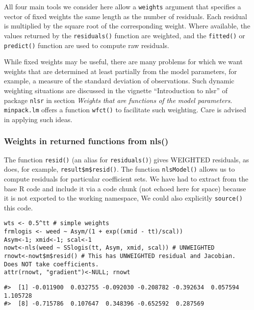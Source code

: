 All four main tools we consider here allow a \texttt{weights} argument that
specifies a vector of fixed weights the same length as the number of residuals.
Each residual is multiplied by the square root of the corresponding weight.
Where available, the values returned by the
\texttt{residuals()} function are weighted, and the \texttt{fitted()} or \texttt{predict()} function are
used to compute raw residuals.

While fixed weights may be useful, there are many problems for which
we want weights that are determined at least partially from the model
parameters, for
example, a measure of the standard deviation of observations.
Such dynamic weighting situations are discussed in the vignette
``Introduction to nlsr'' of package \texttt{nlsr} in section
\emph{Weights that are functions of the model parameters}.
\texttt{minpack.lm} offers a function \texttt{wfct()} to
facilitate such weighting. Care is advised
in applying such ideas.

\hypertarget{weights-in-returned-functions-from-nls}{%
\subsubsection{Weights in returned functions from nls()}\label{weights-in-returned-functions-from-nls}}

The function \texttt{resid()} (an alias for \texttt{residuals()}) gives WEIGHTED residuals,
as does, for example, \texttt{result\$m\$resid()}. The function \texttt{nlsModel()}
allows us to compute residuals for particular coefficient sets.
We have had to extract from the base R code and include it via a code chunk
(not echoed here for space) because it is not exported to the working namespace,
We could also explicitly \texttt{source()} this code.

\begin{verbatim}
wts <- 0.5^tt # simple weights
frmlogis <- weed ~ Asym/(1 + exp((xmid - tt)/scal))
Asym<-1; xmid<-1; scal<-1
nowt<-nls(weed ~ SSlogis(tt, Asym, xmid, scal)) # UNWEIGHTED
rnowt<-nowt$m$resid() # This has UNWEIGHTED residual and Jacobian. Does NOT take coefficients.
attr(rnowt, "gradient")<-NULL; rnowt
\end{verbatim}

\begin{verbatim}
#>  [1] -0.011900  0.032755 -0.092030 -0.208782 -0.392634  0.057594  1.105728
#>  [8] -0.715786  0.107647  0.348396 -0.652592  0.287569
\end{verbatim}

